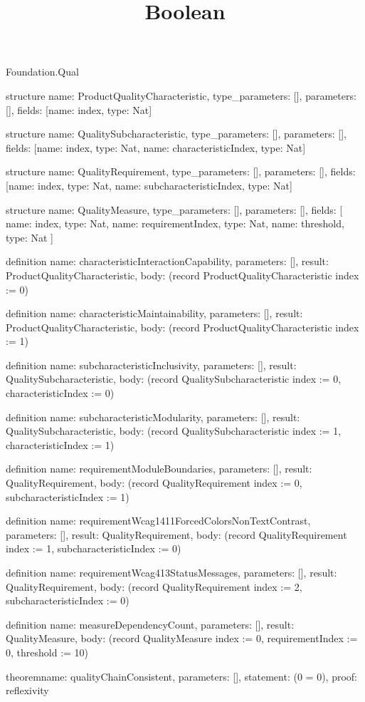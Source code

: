\begin{lexlean}{Foundation.Qual}
\title{Boolean}
\begin{semanticmodule}
structure{
  name: ProductQualityCharacteristic,
  type_parameters: [],
  parameters: [],
  fields: [{name: index, type: Nat}]
}

structure{
  name: QualitySubcharacteristic,
  type_parameters: [],
  parameters: [],
  fields: [{name: index, type: Nat}, {name: characteristicIndex, type: Nat}]
}

structure{
  name: QualityRequirement,
  type_parameters: [],
  parameters: [],
  fields: [{name: index, type: Nat}, {name: subcharacteristicIndex, type: Nat}]
}

structure{
  name: QualityMeasure,
  type_parameters: [],
  parameters: [],
  fields: [
    {name: index, type: Nat},
    {name: requirementIndex, type: Nat},
    {name: threshold, type: Nat}
  ]
}

definition{
  name: characteristicInteractionCapability,
  parameters: [],
  result: ProductQualityCharacteristic,
  body: (record ProductQualityCharacteristic {index := 0})
}

definition{
  name: characteristicMaintainability,
  parameters: [],
  result: ProductQualityCharacteristic,
  body: (record ProductQualityCharacteristic {index := 1})
}

definition{
  name: subcharacteristicInclusivity,
  parameters: [],
  result: QualitySubcharacteristic,
  body: (record QualitySubcharacteristic {index := 0, characteristicIndex := 0})
}

definition{
  name: subcharacteristicModularity,
  parameters: [],
  result: QualitySubcharacteristic,
  body: (record QualitySubcharacteristic {index := 1, characteristicIndex := 1})
}

definition{
  name: requirementModuleBoundaries,
  parameters: [],
  result: QualityRequirement,
  body: (record QualityRequirement {index := 0, subcharacteristicIndex := 1})
}

definition{
  name: requirementWcag1411ForcedColorsNonTextContrast,
  parameters: [],
  result: QualityRequirement,
  body: (record QualityRequirement {index := 1, subcharacteristicIndex := 0})
}

definition{
  name: requirementWcag413StatusMessages,
  parameters: [],
  result: QualityRequirement,
  body: (record QualityRequirement {index := 2, subcharacteristicIndex := 0})
}

definition{
  name: measureDependencyCount,
  parameters: [],
  result: QualityMeasure,
  body: (record QualityMeasure {index := 0, requirementIndex := 0, threshold := 10})
}

theorem{name: qualityChainConsistent, parameters: [], statement: (0 = 0), proof: reflexivity{}}
\end{semanticmodule}
\end{lexlean}

